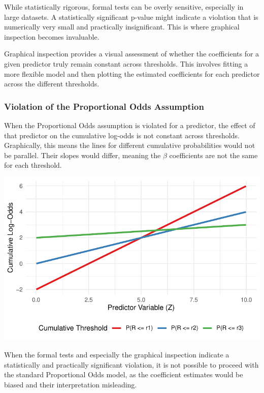 \documentclass[
  letterpaper,
  DIV=11,
  numbers=noendperiod]{scrartcl}
\begin{document}
While statistically rigorous, formal tests can be overly sensitive,
especially in large datasets. A statistically significant p-value might
indicate a violation that is numerically very small and practically
insignificant. This is where graphical inspection becomes invaluable.

Graphical inspection provides a visual assessment of whether the
coefficients for a given predictor truly remain constant across
thresholds. This involves fitting a more flexible model and then
plotting the estimated coefficients for each predictor across the
different thresholds.

\hypertarget{violation-of-the-proportional-odds-assumption}{%
\subsubsection*{Violation of the Proportional Odds
Assumption}\label{violation-of-the-proportional-odds-assumption}}

When the Proportional Odds assumption is violated for a predictor, the
effect of that predictor on the cumulative log-odds is not constant
across thresholds. Graphically, this means the lines for different
cumulative probabilities would not be parallel. Their slopes would
differ, meaning the \(\beta\) coefficients are not the same for each
threshold.

\includegraphics{Ordinal_data_an_R_files/figure-pdf/unnamed-chunk-10-1.pdf}

When the formal tests and especially the graphical inspection indicate a
statistically and practically significant violation, it is not possible
to proceed with the standard Proportional Odds model, as the coefficient
estimates would be biased and their interpretation misleading.
\end{document}
